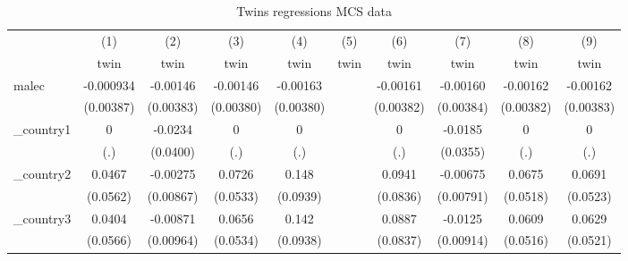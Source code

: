 \begin{table}[htbp]\centering
\def\sym#1{\ifmmode^{#1}\else\(^{#1}\)\fi}
\caption{Twins regressions MCS data}
\begin{tabular}{l*{9}{c}}
\hline\hline
            &\multicolumn{1}{c}{(1)}&\multicolumn{1}{c}{(2)}&\multicolumn{1}{c}{(3)}&\multicolumn{1}{c}{(4)}&\multicolumn{1}{c}{(5)}&\multicolumn{1}{c}{(6)}&\multicolumn{1}{c}{(7)}&\multicolumn{1}{c}{(8)}&\multicolumn{1}{c}{(9)}\\
            &\multicolumn{1}{c}{twin}&\multicolumn{1}{c}{twin}&\multicolumn{1}{c}{twin}&\multicolumn{1}{c}{twin}&\multicolumn{1}{c}{twin}&\multicolumn{1}{c}{twin}&\multicolumn{1}{c}{twin}&\multicolumn{1}{c}{twin}&\multicolumn{1}{c}{twin}\\
\hline
malec       &   -0.000934         &    -0.00146         &    -0.00146         &    -0.00163         &                     &    -0.00161         &    -0.00160         &    -0.00162         &    -0.00162         \\
            &   (0.00387)         &   (0.00383)         &   (0.00380)         &   (0.00380)         &                     &   (0.00382)         &   (0.00384)         &   (0.00382)         &   (0.00383)         \\
[1em]
\_country1   &           0         &     -0.0234         &           0         &           0         &                     &           0         &     -0.0185         &           0         &           0         \\
            &         (.)         &    (0.0400)         &         (.)         &         (.)         &                     &         (.)         &    (0.0355)         &         (.)         &         (.)         \\
[1em]
\_country2   &      0.0467         &    -0.00275         &      0.0726         &       0.148         &                     &      0.0941         &    -0.00675         &      0.0675         &      0.0691         \\
            &    (0.0562)         &   (0.00867)         &    (0.0533)         &    (0.0939)         &                     &    (0.0836)         &   (0.00791)         &    (0.0518)         &    (0.0523)         \\
[1em]
\_country3   &      0.0404         &    -0.00871         &      0.0656         &       0.142         &                     &      0.0887         &     -0.0125         &      0.0609         &      0.0629         \\
            &    (0.0566)         &   (0.00964)         &    (0.0534)         &    (0.0938)         &                     &    (0.0837)         &   (0.00914)         &    (0.0516)         &    (0.0521)         \\

\end{tabular}
\end{table}
